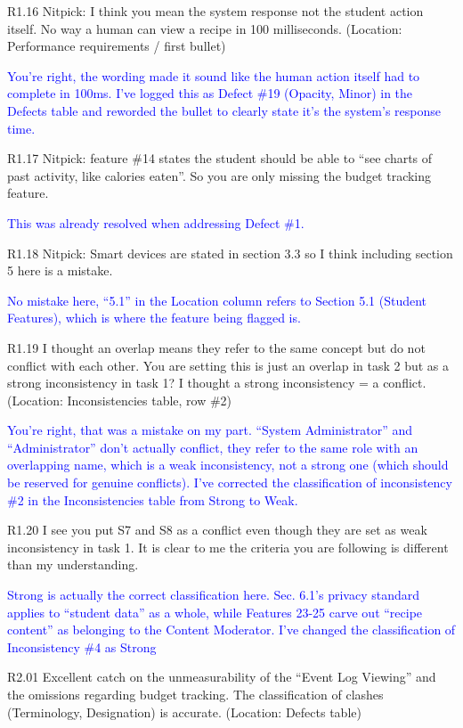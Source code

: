 \documentclass[10pt,letterpaper]{article}
\begin{document}
R1.16 Nitpick: I think you mean the system response not the student action itself. No way a human can view a recipe in 100 milliseconds. (Location: Performance requirements / first bullet)

\textcolor{blue}{You're right, the wording made it sound like the human action itself had to complete in 100ms. I've logged this as Defect \#19 (Opacity, Minor) in the Defects table and reworded the bullet to clearly state it's the system's response time.}

R1.17 Nitpick: feature \#14 states the student should be able to ``see charts of past activity, like calories eaten''. So you are only missing the budget tracking feature.

\textcolor{blue}{This was already resolved when addressing Defect \#1.}

R1.18 Nitpick: Smart devices are stated in section 3.3 so I think including section 5 here is a mistake.

\textcolor{blue}{No mistake here, ``5.1'' in the Location column refers to Section 5.1 (Student Features), which is where the feature being flagged is.}

R1.19 I thought an overlap means they refer to the same concept but do not conflict with each other. You are setting this is just an overlap in task 2 but as a strong inconsistency in task 1? I thought a strong inconsistency = a conflict. (Location: Inconsistencies table, row \#2)

\textcolor{blue}{You're right, that was a mistake on my part. ``System Administrator'' and ``Administrator'' don't actually conflict, they refer to the same role with an overlapping name, which is a weak inconsistency, not a strong one (which should be reserved for genuine conflicts). I've corrected the classification of inconsistency \#2 in the Inconsistencies table from Strong to Weak.}

R1.20 I see you put S7 and S8 as a conflict even though they are set as weak inconsistency in task 1. It is clear to me the criteria you are following is different than my understanding.

\textcolor{blue}{Strong is actually the correct classification here. Sec. 6.1's privacy standard applies to ``student data'' as a whole, while Features 23-25 carve out ``recipe content'' as belonging to the Content Moderator. I've changed the classification of Inconsistency \#4 as Strong}

R2.01 Excellent catch on the unmeasurability of the ``Event Log Viewing'' and the omissions regarding budget tracking. The classification of clashes (Terminology, Designation) is accurate. (Location: Defects table)
\end{document}
